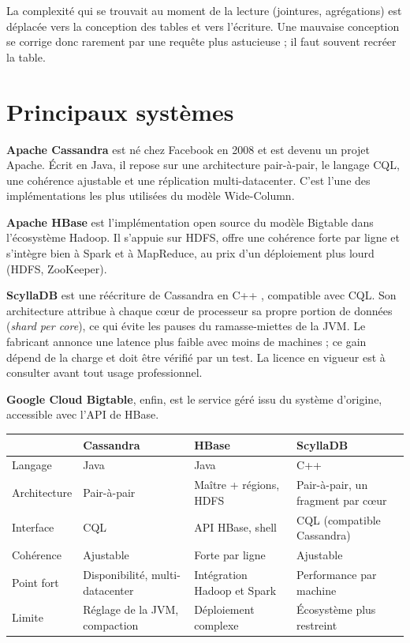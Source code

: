 \documentclass[11pt,a4paper]{article}
\begin{document}
La complexité qui se trouvait au moment de la lecture (jointures, agrégations) est déplacée vers la conception des tables et vers l'écriture. Une mauvaise conception se corrige donc rarement par une requête plus astucieuse ; il faut souvent recréer la table.

\section{Principaux systèmes}
\label{sec:sys}

\textbf{Apache Cassandra} est né chez Facebook en 2008 et est devenu un projet Apache. Écrit en Java, il repose sur une architecture pair-à-pair, le langage CQL, une cohérence ajustable et une réplication multi-datacenter. C'est l'une des implémentations les plus utilisées du modèle Wide-Column.

\textbf{Apache HBase} est l'implémentation open source du modèle Bigtable dans l'écosystème Hadoop. Il s'appuie sur HDFS, offre une cohérence forte par ligne et s'intègre bien à Spark et à MapReduce, au prix d'un déploiement plus lourd (HDFS, ZooKeeper).

\textbf{ScyllaDB} est une réécriture de Cassandra en C++ \cite{scylla}, compatible avec CQL. Son architecture attribue à chaque cœur de processeur sa propre portion de données (\emph{shard per core}), ce qui évite les pauses du ramasse-miettes de la JVM. Le fabricant annonce une latence plus faible avec moins de machines ; ce gain dépend de la charge et doit être vérifié par un test. La licence en vigueur est à consulter avant tout usage professionnel.

\textbf{Google Cloud Bigtable}, enfin, est le service géré issu du système d'origine, accessible avec l'API de HBase.

\begin{center}
\small
\begin{tabularx}{\textwidth}{@{}>{\raggedright\arraybackslash}p{2.4cm}>{\raggedright\arraybackslash}X>{\raggedright\arraybackslash}X>{\raggedright\arraybackslash}X@{}}
\toprule
 & Cassandra & HBase & ScyllaDB \\
\midrule
Langage & Java & Java & C++ \\
Architecture & Pair-à-pair & Maître + régions, HDFS & Pair-à-pair, un fragment par cœur \\
Interface & CQL & API HBase, shell & CQL (compatible Cassandra) \\
Cohérence & Ajustable & Forte par ligne & Ajustable \\
Point fort & Disponibilité, multi-datacenter & Intégration Hadoop et Spark & Performance par machine \\
Limite & Réglage de la JVM, compaction & Déploiement complexe & Écosystème plus restreint \\
\bottomrule
\end{tabularx}
\end{center}
\end{document}
